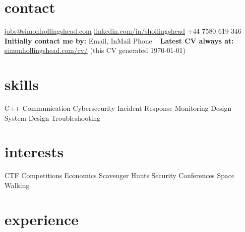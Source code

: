 \documentclass[a4paper]{friggeri-cv} %
\begin{document}

\begin{aside} %
\section{contact}
\href{mailto:jobs@simonhollingshead.com}{\footnotesize{jobs@simonhollingshead.com}}
\href{https://linkedin.com/in/shollingshead}{\footnotesize{linkedin.com/in/shollingshead}}
+44 7580 619 346
~
{\textbf{Initially contact me by:}}
Email, InMail 
Phone 
~
{\textbf{Latest CV always at:}}
\href{https://simonhollingshead.com/cv/}{\footnotesize{simonhollingshead.com/cv/}}
{\footnotesize{(this CV generated \today)}}
~
\section{skills}
C++
Communication
Cybersecurity
Incident Response
Monitoring Design
System Design
Troubleshooting
~
\section{interests}
CTF Competitions
Economics
Scavenger Hunts
Security Conferences
Space
Walking
\end{aside}


\section{experience}
\end{document}
